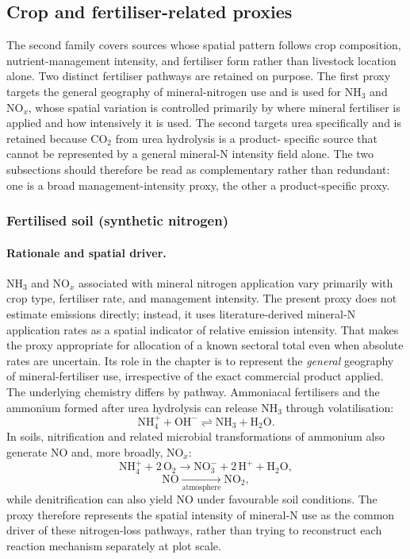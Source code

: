 \subsection{Crop and fertiliser-related proxies}

The second family covers sources whose spatial pattern follows crop
composition, nutrient-management intensity, and fertiliser form rather
than livestock location alone. Two distinct fertiliser pathways are
retained on purpose. The first proxy targets the general geography of
mineral-nitrogen use and is used for NH$_3$ and NO$_x$, whose spatial
variation is controlled primarily by where mineral fertiliser is applied
and how intensively it is used. The second targets urea specifically
and is retained because CO$_2$ from urea hydrolysis is a product-
specific source that cannot be represented by a general mineral-N
intensity field alone. The two subsections should therefore be read as
complementary rather than redundant: one is a broad management-intensity
proxy, the other a product-specific proxy.

\subsubsection{Fertilised soil (synthetic nitrogen)}
\label{sec:mu-rho-synth}

\paragraph{Rationale and spatial driver.}
NH$_3$ and NO$_x$ associated with mineral nitrogen application vary
primarily with crop type, fertiliser rate, and management intensity.
The present proxy does not estimate emissions directly; instead, it
uses literature-derived mineral-N application rates as a spatial
indicator of relative emission intensity. That makes the proxy
appropriate for allocation of a known sectoral total even when absolute
rates are uncertain. Its role in the chapter is to represent the
\emph{general} geography of mineral-fertiliser use, irrespective of the
exact commercial product applied. The underlying chemistry differs by
pathway.
Ammoniacal fertilisers and the ammonium formed after urea hydrolysis can
release NH$_3$ through volatilisation:
\begin{equation}
  \mathrm{NH_4^+ + OH^- \rightleftharpoons NH_3 + H_2O}.
\end{equation}
In soils, nitrification and related microbial transformations of
ammonium also generate NO and, more broadly, NO$_x$:
\begin{equation}
  \mathrm{NH_4^+ + 2\,O_2 \rightarrow NO_3^- + 2\,H^+ + H_2O},
\end{equation}
\begin{equation}
  \mathrm{NO \xrightarrow[\text{atmosphere}]{} NO_2},
\end{equation}
while denitrification can also yield NO under favourable soil
conditions. The proxy therefore represents the spatial intensity of
mineral-N use as the common driver of these nitrogen-loss pathways,
rather than trying to reconstruct each reaction mechanism separately at
plot scale.

